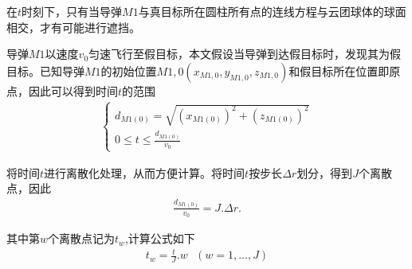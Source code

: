 \documentclass[../main.tex]{subfiles}
\begin{document}
\par 在$t$时刻下，只有当导弹$M1$与真目标所在圆柱所有点的连线方程与云团球体的球面相交，才有可能进行遮挡。
\par 导弹$M1$以速度$v_0$匀速飞行至假目标，本文假设当导弹到达假目标时，发现其为假目标。已知导弹$M1$的初始位置\( M{1,0}(x_{M{1,0}}, y_{M{1,0}}, z_{M{1,0}}) \)和假目标所在位置即原点，因此可以得到时间$t$的范围
\begin{align}\label{1.190}
\begin{cases}
d_{M1(0)} = \sqrt{(x_{M1(0)})^2 + (z_{M1(0)})^2} \\
0 \leq t \leq \frac{d_{M1(0)}}{v_0}
\end{cases}
\end{align}
\par 将时间$t$进行离散化处理，从而方便计算。将时间$t$按步长$\varDelta r$划分，得到$J$个离散点，因此
\begin{align}\label{1.191}
	\frac{d_{M1(0)}}{v_0}=J.\varDelta r .
\end{align}

\par 其中第$w$个离散点记为$t_w$,计算公式如下
\begin{align}\label{1.52}
	t_w=\frac{t}{J}.w\,\,\,\,\left( w=1,...,J\right) 
\end{align}
\end{document}

